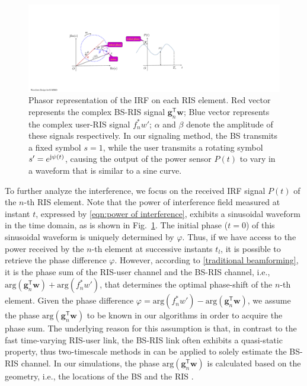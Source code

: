 \documentclass[journal,twocolumn]{IEEEtran}
\theoremstyle{nonumberplain}
\def \T {\bm \Theta}
\def \arg {\text{arg}}
\def \T {^{\mathsf{T}}}
\begin{document}
    \begin{figure}[!t]
        \centering
        \includegraphics[width=\linewidth]{figures/phasor.pdf}
        \caption{Phasor representation of the \ac{IRF} on each RIS element. Red vector represents the complex BS-RIS signal ${\bm g}_n\T{\bm w}$; Blue vector represents the complex user-RIS signal $f_n^*w'$; $\alpha$ and $\beta$ denote the amplitude of these signals respectively. In our signaling method, the BS transmits a fixed symbol $s=1$, while the user transmits a rotating symbol $s'=e^{{\rm j}\psi(t)}$, causing the output of the power sensor $P(t)$ to vary in a waveform that is similar to a sine curve.}
        \label{fig:phasor}
    \end{figure}
    To further analyze the interference, we focus on the received IRF signal $P(t)$ of the $n$-th RIS element. 
    Note that the power of interference field measured at instant $t$, expressed by \eqref{eqn:power of interference}, exhibits a sinusoidal waveform in the time domain, as is shown in Fig.~\ref{fig:phasor}. 
    The initial phase ($t=0$) of this sinusoidal waveform is uniquely determined by $\varphi$.
    Thus, if we have access to the power received by the $n$-th element at successive instants $t_l$, it is possible to retrieve the phase difference $\varphi$. 
    However, according to \eqref{traditional beamforming}, it is the phase sum of the RIS-user channel and the BS-RIS channel, i.e., $\arg({\bm g}_n\T{\bm w})+\arg(f_n^*w')$, that determines the optimal phase-shift of the $n$-th element. Given the phase difference $\varphi = \arg\left(f_{n}^{*}w'\right)-\arg\left(\bm g_{n}\T\bm w\right)$, we assume the phase $\arg({\bm g}_n\T{\bm w})$ to be known in our algorithms in order to acquire the phase sum.
    The underlying reason for this assumption is that, in contrast to the fast time-varying RIS-user link, the BS-RIS link often exhibits a quasi-static property, thus two-timescale methods in \cite{Huchen} can be applied to solely estimate the BS-RIS channel.
    In our simulations, the phase $\arg({\bm g}_n\T{\bm w})$ is calculated based on the geometry, i.e., the locations of the BS and the RIS \cite{bai2014coverage}. 
\end{document}
